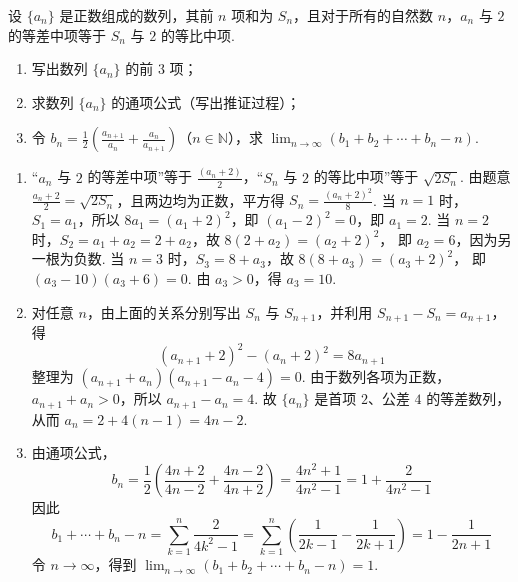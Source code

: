 \documentclass[UTF8,a4paper,oneside,11pt]{ctexbook}
\begin{document}
\begin{problem}
设 \(\{a_{n}\}\) 是正数组成的数列，其前 \(n\) 项和为 \(S_{n}\)，且对于所有的自然数 \(n\)，\(a_{n}\) 与 \(2\) 的等差中项等于 \(S_{n}\) 与 \(2\) 的等比中项.

\begin{enumerate}
\item 写出数列 \(\{a_{n}\}\) 的前 \(3\) 项；
\item 求数列 \(\{a_{n}\}\) 的通项公式（写出推证过程）；
    \item 令 \(b_{n} = \frac{1}{2}\left(\frac{a_{n+1}}{a_{n}} + \frac{a_{n}}{a_{n+1}}\right)\)（\(n \in \mathbb{N}\)），求 \(\displaystyle\lim_{n \to \infty}\left(b_{1} + b_{2} + \cdots + b_{n} - n\right)\).
\end{enumerate}
\end{problem}

\begin{solution}
\begin{enumerate}
\item “\(a_n\) 与 \(2\) 的等差中项”等于 \(\frac{(a_n+2)}{2}\)，“\(S_n\) 与 \(2\) 的等比中项”等于 \(\sqrt{2S_n}\). 由题意 \(\frac{a_n+2}{2}=\sqrt{2S_n}\)，且两边均为正数，平方得 \(S_n=\frac{(a_n+2)^2}{8}\).
当 \(n=1\) 时，\(S_1=a_1\)，所以
\(8a_1=(a_1+2)^2\)，即 \((a_1-2)^2=0\)，即 \(a_1=2\). 当 \(n=2\) 时，\(S_2=a_1+a_2=2+a_2\)，故 \(8(2+a_2)=(a_2+2)^2\)，
即 \(a_2=6\)，因为另一根为负数. 当 \(n=3\) 时，\(S_3=8+a_3\)，故
\(8(8+a_3)=(a_3+2)^2\)，
即 \((a_3-10)(a_3+6)=0\). 由 \(a_3>0\)，得 \(a_3=10\).
\item 对任意 \(n\)，由上面的关系分别写出 \(S_n\) 与 \(S_{n+1}\)，并利用 \(S_{n+1}-S_n=a_{n+1}\)，得
\[
(a_{n+1}+2)^2-(a_n+2)^2=8a_{n+1}
\]
整理为
\((a_{n+1}+a_n)(a_{n+1}-a_n-4)=0\).
由于数列各项为正数，\(a_{n+1}+a_n>0\)，所以
\(a_{n+1}-a_n=4\).
故 \(\{a_n\}\) 是首项 \(2\)、公差 \(4\) 的等差数列，从而
\(a_n=2+4(n-1)=4n-2\).
\item 由通项公式，
\[
b_n=\frac12\left(\frac{4n+2}{4n-2}+\frac{4n-2}{4n+2}\right)
=\frac{4n^2+1}{4n^2-1}
=1+\frac{2}{4n^2-1}
\]
因此
\[
b_1+\cdots+b_n-n
=\sum_{k=1}^{n}\frac{2}{4k^2-1}
=\sum_{k=1}^{n}\left(\frac{1}{2k-1}-\frac{1}{2k+1}\right)
=1-\frac{1}{2n+1}
\]
令 \(n\to\infty\)，得到 \(\lim_{n\to\infty}\left(b_1+b_2+\cdots+b_n-n\right)=1\).
\end{enumerate}
\end{solution}

\end{document}
